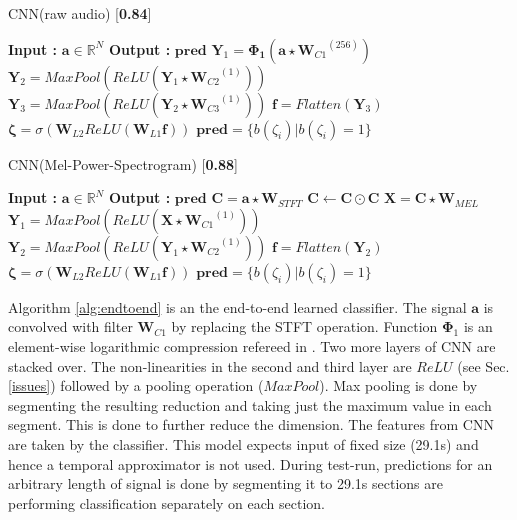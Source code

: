\begin{minipage}[t]{7.5cm}
  \vspace{0pt}  
  \begin{algorithm}[H]
    \caption{CNN(raw audio) [\textbf{0.84}]}\label{alg:endtoend}
    \begin{algorithmic}[1]
      \Statex \textbf{Input :} $\textbf{a} \in \mathbb{R}^{N}$
      \Statex \textbf{Output :} $\textbf{pred}$ 
      \State $\textbf{Y}_{1}  = \bm{\Phi_{1}}(\textbf{a}\star{\textbf{W}_{C1}}^{(256)})$
      \State $\textbf{Y}_{2} =  MaxPool(ReLU(\textbf{Y}_{1}\star{\textbf{W}_{C2}}^{(1)}))$
       \State $\textbf{Y}_{3} = MaxPool(ReLU(\textbf{Y}_{2}\star{\textbf{W}_{C3}}^{(1)}))$
       \State $\textbf{f} = Flatten(\textbf{Y}_{3})$
       \State $\bm{\zeta} = \sigma(\textbf{W}_{L2}ReLU(\textbf{W}_{L1}\textbf{f}))$
       \State $\textbf{pred} = \{ b(\zeta_{i}) | b(\zeta_{i}) = 1 \}$ 
       \State
   \end{algorithmic}
  \end{algorithm}
\end{minipage}%
\begin{minipage}[t]{7.5cm}
  \vspace{0pt}
  \begin{algorithm}[H]
    \caption{CNN(Mel-Power-Spectrogram) [\textbf{0.88}]}\label{alg:meltoend}
     \begin{algorithmic}[1]
      \Statex \textbf{Input :} $\textbf{a} \in \mathbb{R}^{N}$
      \Statex \textbf{Output :} $\textbf{pred}$  
      \State $\textbf{C}  = \textbf{a} \star \textbf{W}_{STFT}$
      \State $\textbf{C}  \leftarrow \textbf{C} \odot \textbf{C}$
       \State $\textbf{X} = \textbf{C} \star \textbf{W}_{MEL}$
       \State $\textbf{Y}_{1} =  MaxPool(ReLU(\textbf{X}\star{\textbf{W}_{C1}}^{(1)}))$
       \State $\textbf{Y}_{2} = MaxPool(ReLU(\textbf{Y}_{1}\star{\textbf{W}_{C2}}^{(1)}))$
       \State $\textbf{f} = Flatten(\textbf{Y}_{2})$
       \State $\bm{\zeta} = \sigma(\textbf{W}_{L2}ReLU(\textbf{W}_{L1}\textbf{f}))$
       \State $\textbf{pred} = \{ b(\zeta_{i}) | b(\zeta_{i}) = 1 \}$
   \end{algorithmic}
  \end{algorithm}
\end{minipage}
\FloatBarrier
\noindent Algorithm \ref{alg:endtoend} is an the end-to-end learned classifier. The signal $\textbf{a}$ is convolved with filter $\textbf{W}_{C1}$ by replacing the STFT operation. Function $\bm{\Phi}_{1}$ is an element-wise logarithmic compression refereed in \cite{EndToEnd}.  Two more layers of CNN are stacked over. The non-linearities in the second and third layer are $ReLU$ (see Sec. \ref{issues}) followed by a pooling operation ($MaxPool$). Max pooling is done by segmenting the resulting reduction and taking just the maximum value in each segment. This is done to further reduce the dimension. The features from CNN are taken by the classifier. This model expects input of fixed size (29.1s) and hence a temporal approximator is not used. During test-run, predictions for an arbitrary length of signal is done by segmenting it to 29.1s sections are performing classification separately on each section.  
\bigskip


